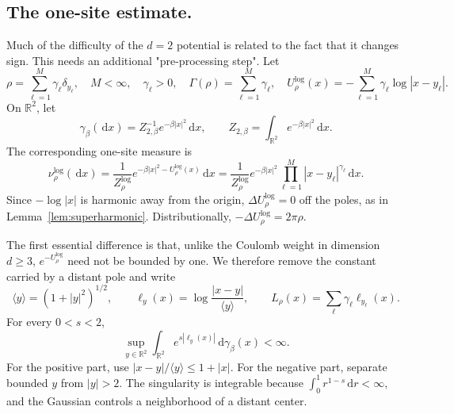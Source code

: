 \documentclass[12pt,reqno,letterpaper]{amsart}
\theoremstyle{definition}
\theoremstyle{remark}
\numberwithin{equation}{section}
\newcommand{\R}{\mathbb R}
\newcommand{\dd}{\,\mathrm d}
\newcommand{\be}{\beta}
\begin{document}
\begin{appendix}
\subsection{The one-site estimate.}
Much of the difficulty of the $d=2$ potential is related to the fact that it changes sign. This needs an additional "pre-processing step".
Let
\[
 \rho=\sum_{\ell=1}^M\gamma_\ell\delta_{y_\ell},
 \quad M<\infty,\quad \gamma_\ell>0,
 \quad
 \Gamma(\rho)=\sum_{\ell=1}^M\gamma_\ell,
 \quad
 U_\rho^{\log}(x)=-\sum_{\ell=1}^M\gamma_\ell\log|x-y_\ell|.
\]
On \(\R^2\), let
\[
 \gamma_\be(\dd x)=Z_{2,\be}^{-1}e^{-\be|x|^2}\dd x,
 \qquad
 Z_{2,\be}=\int_{\R^2}e^{-\be|x|^2}\dd x.
\]
The corresponding one-site measure is
\begin{equation}\label{eq:planar-one-site-law}
 \nu_\rho^{\log}(\dd x)
 =\frac1{Z_\rho^{\log}}
 e^{-\be|x|^2-U_\rho^{\log}(x)}\dd x
 =\frac1{Z_\rho^{\log}}e^{-\be|x|^2}
 \prod_{\ell=1}^M|x-y_\ell|^{\gamma_\ell}\dd x.
\end{equation}
Since \(-\log|x|\) is harmonic away from the origin,
\(\Delta U_\rho^{\log}=0\) off the poles, as in
Lemma~\ref{lem:superharmonic}.  Distributionally,
\(-\Delta U_\rho^{\log}=2\pi\rho\).

The first essential difference is that, unlike the Coulomb weight in dimension \(d\ge3\),
\(e^{-U_\rho^{\log}}\) need not be bounded by one.  We therefore remove the
constant carried by a distant pole and write
\[
 \langle y\rangle=(1+|y|^2)^{1/2},
 \qquad
 \ell_y(x)=\log\frac{|x-y|}{\langle y\rangle},
 \qquad
 L_\rho(x)=\sum_\ell\gamma_\ell\ell_{y_\ell}(x).
\]
For every \(0<s<2\),
\begin{equation}\label{eq:planar-gaussian-log-moment}
 \sup_{y\in\R^2}
 \int_{\R^2}e^{s|\ell_y(x)|}\dd\gamma_\be(x)<\infty.
\end{equation}
For the positive part, use
\(|x-y|/\langle y\rangle\le1+|x|\).  For the negative part, separate bounded
\(y\) from \(|y|>2\).  The singularity is integrable because
\(\int_0^1r^{1-s}\dd r<\infty\), and the Gaussian controls a neighborhood of
a distant center.


\end{appendix}
\end{document}
